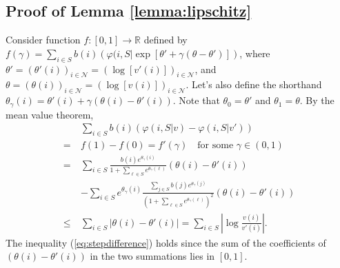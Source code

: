 \documentclass{article}
\theoremstyle{definition}
\newcommand{\NNN}{\mathcal{N}}
\newcommand{\RRR}{\mathbb{R}}
\begin{document}
\subsection{Proof of Lemma \ref{lemma:lipschitz}}
Consider function $f:[0, 1]\rightarrow \RRR$ defined by $f(\gamma) = \sum_{i \in S}b(i)\left(\varphi(i, S |\exp\left[\theta' + \gamma(\theta - \theta')\right]\right)$, where $\theta' = (\theta'(i))_{i\in \NNN} = (\log [v'(i)])_{i\in \NNN}$, and $\theta = (\theta(i))_{i\in \NNN} = (\log [v(i)])_{i\in \NNN}$. Let's also define the shorthand $\theta_\gamma(i) = \theta'(i) + \gamma(\theta(i) - \theta'(i))$. Note that $\theta_0 = \theta'$ and $\theta_1 = \theta$. By the mean value theorem, 
\begin{align}
&\sum_{i \in S}b(i)\left(\varphi(i, S |v) - \varphi(i, S |v')\right) \nonumber\\
=&f(1) - f(0) =f'(\gamma) \quad\text{for some $\gamma\in(0, 1)$}\nonumber\\
=&\sum_{i\in S}\frac{b(i)e^{\theta_\gamma(i)}}{1+ \sum_{\ell\in S}e^{\theta_\gamma(\ell)}}(\theta(i) - \theta'(i)) \nonumber\\
\quad &- \sum_{i\in S}e^{\theta_\gamma(i)}\frac{\sum_{j\in S}b(j)e^{\theta_\gamma(j)}}{(1+ \sum_{\ell\in S}e^{\theta_\gamma(\ell)})^2}(\theta(i) - \theta'(i))\label{eq:stepdifference}\\
\leq & \sum_{i\in S} \left|\theta(i) - \theta'(i)\right| = \sum_{i\in S} \left|\log\frac{v(i)}{v'(i)}\right|.\nonumber
\end{align}
The inequality (\ref{eq:stepdifference}) holds since the sum of the coefficients of $(\theta(i) - \theta'(i))$ in the two summations lies in $[0, 1]$.
\end{document}
